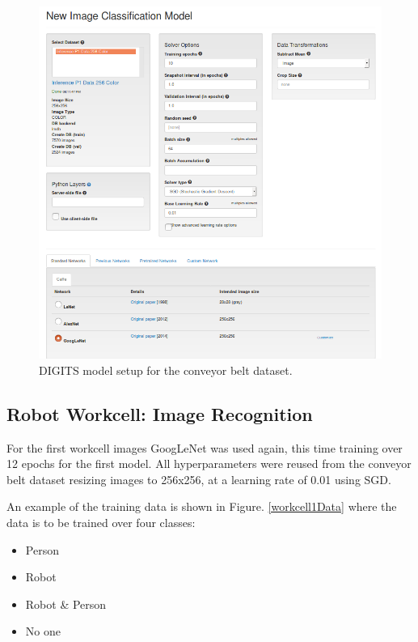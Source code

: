 \documentclass[10pt,journal,compsoc]{IEEEtran}
\begin{document}
\begin{figure}[thpb]
  \centering
  \includegraphics[width=\linewidth]{../img/P1-Dataset/P1-Model-Setup.png}
  \caption{DIGITS model setup for the conveyor belt dataset.}
  \label{p1ModelSetup}
\end{figure}


\subsection{Robot Workcell: Image Recognition}
\label{subsec:WC1Formulation}

For the first workcell images GoogLeNet was used again, this time training over 12 epochs for the first model. All hyperparameters were reused from the conveyor belt dataset resizing images to 256x256, at a learning rate of 0.01 using SGD.

An example of the training data is shown in Figure. \ref{workcell1Data} where the data is to be trained over four classes:

\begin{itemize}
  \item Person
  \item Robot
  \item Robot \& Person
  \item No one
\end{itemize}
\end{document}
